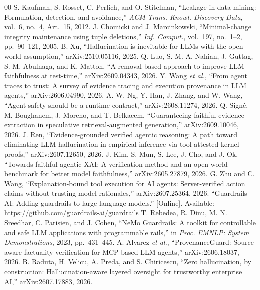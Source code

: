 \documentclass[conference]{IEEEtran}
\begin{document}
\begin{thebibliography}{00}
 S. Kaufman, S. Rosset, C. Perlich, and O. Stitelman, ``Leakage in data mining: Formulation, detection, and avoidance,'' \emph{ACM Trans. Knowl. Discovery Data}, vol.~6, no.~4, Art.~15, 2012.
 J. Chomicki and J. Marcinkowski, ``Minimal-change integrity maintenance using tuple deletions,'' \emph{Inf. Comput.}, vol.~197, no.~1--2, pp.~90--121, 2005.
 B. Xu, ``Hallucination is inevitable for LLMs with the open world assumption,'' arXiv:2510.05116, 2025.
 Q. Luo, S. M. A. Nahian, J. Guttag, S. M. Abulnaga, and K. Matton, ``A removal based approach to improve LLM faithfulness at test-time,'' arXiv:2609.04343, 2026.
 Y. Wang \emph{et al.}, ``From agent traces to trust: A survey of evidence tracing and execution provenance in LLM agents,'' arXiv:2606.04990, 2026.
 A. W. Ng, Y. Han, J. Zhang, and W. Wang, ``Agent safety should be a runtime contract,'' arXiv:2608.11274, 2026.
 Q. Sign\'{e}, M. Boughanem, J. Moreno, and T. Belkacem, ``Guaranteeing faithful evidence extraction in speculative retrieval-augmented generation,'' arXiv:2609.10046, 2026.
 J. Ren, ``Evidence-grounded verified agentic reasoning: A path toward eliminating LLM hallucination in empirical inference via tool-attested kernel proofs,'' arXiv:2607.12650, 2026.
 J. Kim, S. Mun, S. Lee, J. Cho, and J. Ok, ``Towards faithful agentic XAI: A verification method and an open-world benchmark for better model faithfulness,'' arXiv:2605.27879, 2026.
 G. Zhu and C. Wang, ``Explanation-bound tool execution for AI agents: Server-verified action claims without trusting model rationales,'' arXiv:2607.25364, 2026.
 ``Guardrails AI: Adding guardrails to large language models.'' [Online]. Available: \url{https://github.com/guardrails-ai/guardrails}
 T. Rebedea, R. Dinu, M. N. Sreedhar, C. Parisien, and J. Cohen, ``NeMo Guardrails: A toolkit for controllable and safe LLM applications with programmable rails,'' in \emph{Proc. EMNLP: System Demonstrations}, 2023, pp.~431--445.
 A. Alvarez \emph{et al.}, ``ProvenanceGuard: Source-aware factuality verification for MCP-based LLM agents,'' arXiv:2606.18037, 2026.
 B. Raduta, H. Velicu, A. Preda, and S. Chiricescu, ``Zero hallucination, by construction: Hallucination-aware layered oversight for trustworthy enterprise AI,'' arXiv:2607.17883, 2026.

\end{thebibliography}
\end{document}
